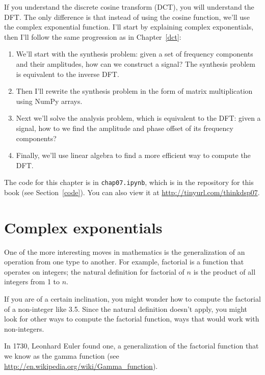 \documentclass[12pt]{book}
\begin{document}
If you understand the discrete cosine transform (DCT), you will
understand the DFT.  The only difference is that instead of using the
cosine function, we'll use the complex exponential function.  I'll
start by explaining complex exponentials, then I'll follow the
same progression as in Chapter~\ref{dct}:

\begin{enumerate}

\item We'll start with the synthesis
  problem: given a set of frequency components and their amplitudes,
  how can we construct a signal?  The synthesis problem is 
  equivalent to the inverse DFT.

\item Then I'll rewrite the synthesis problem in the form of matrix
  multiplication using NumPy arrays.

\item Next we'll solve the analysis problem, which is equivalent to
  the DFT: given a signal, how to we find the amplitude and phase
  offset of its frequency components?

\item Finally, we'll use linear algebra to find a more efficient way
  to compute the DFT.

\end{enumerate}

The code for this chapter is in {\tt chap07.ipynb}, which is in the
repository for this book (see Section~\ref{code}).
You can also view it at \url{http://tinyurl.com/thinkdsp07}.


\section{Complex exponentials}

One of the more interesting moves in mathematics is the generalization
of an operation from one type to another.  For example, factorial is a
function that operates on integers; the natural definition for
factorial of $n$ is the product of all integers from 1 to $n$.

If you are of a certain inclination, you might wonder how to compute
the factorial of a non-integer like 3.5.  Since the natural definition
doesn't apply, you might look for other ways to compute the factorial
function, ways that would work with non-integers.

In 1730, Leonhard Euler found one, a generalization of the factorial
function that we know as the gamma function (see
\url{http://en.wikipedia.org/wiki/Gamma_function}).
\end{document}

